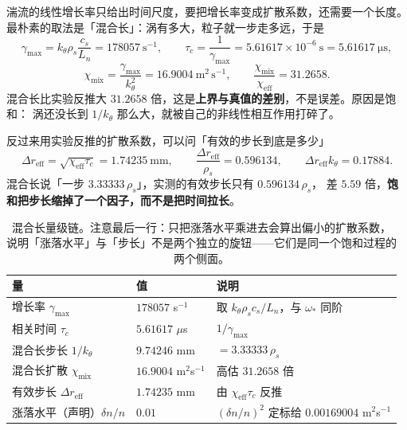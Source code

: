 湍流的线性增长率只给出时间尺度，要把增长率变成扩散系数，还需要一个长度。
最朴素的取法是「混合长」：涡有多大，粒子就一步走多远，于是
\begin{equation}
\gamma_{\max}=k_\theta\rho_s\frac{c_s}{L_n}=178057\ \mathrm{s^{-1}},
\qquad
\tau_c=\frac{1}{\gamma_{\max}}=5.61617\times10^{-6}\ \mathrm{s}=5.61617\ \mathrm{\mu s},
\label{eq:app-af-gamma}
\end{equation}
\begin{equation}
\chi_{\mathrm{mix}}=\frac{\gamma_{\max}}{k_\theta^2}=16.9004\ \mathrm{m^2\,s^{-1}},
\qquad
\frac{\chi_{\mathrm{mix}}}{\chi_{\mathrm{eff}}}=31.2658.
\label{eq:app-af-mixing}
\end{equation}
混合长比实验反推大 $31.2658$ 倍，这是\textbf{上界与真值的差别}，不是误差。原因是饱和：
涡还没长到 $1/k_\theta$ 那么大，就被自己的非线性相互作用打碎了。

反过来用实验反推的扩散系数，可以问「有效的步长到底是多少」
\begin{equation}
\Delta r_{\mathrm{eff}}=\sqrt{\chi_{\mathrm{eff}}\tau_c}=1.74235\ \mathrm{mm},
\qquad
\frac{\Delta r_{\mathrm{eff}}}{\rho_s}=0.596134,
\qquad
\Delta r_{\mathrm{eff}}k_\theta=0.17884.
\label{eq:app-af-dreff}
\end{equation}
混合长说「一步 $3.33333\,\rho_s$」，实测的有效步长只有 $0.596134\,\rho_s$，
差 $5.59$ 倍，\textbf{饱和把步长缩掉了一个因子，而不是把时间拉长}。

\begin{table}[htbp]
\centering
\small
\caption{混合长量级链。注意最后一行：只把涨落水平乘进去会算出偏小的扩散系数，
说明「涨落水平」与「步长」不是两个独立的旋钮——它们是同一个饱和过程的两个侧面。}
\label{tab:app-af-saturation}
\begin{tabular}{p{4.4cm}p{3.2cm}p{4.6cm}}
\toprule
量 & 值 & 说明 \\
\midrule
增长率 $\gamma_{\max}$ & $178057$ s$^{-1}$ & 取 $k_\theta\rho_sc_s/L_n$，与 $\omega_*$ 同阶 \\
相关时间 $\tau_c$ & $5.61617$ $\mu$s & $1/\gamma_{\max}$ \\
混合长步长 $1/k_\theta$ & $9.74246$ mm & $=3.33333\,\rho_s$ \\
混合长扩散 $\chi_{\mathrm{mix}}$ & $16.9004$ m$^2$s$^{-1}$ & 高估 $31.2658$ 倍 \\
有效步长 $\Delta r_{\mathrm{eff}}$ & $1.74235$ mm & 由 $\chi_{\mathrm{eff}}\tau_c$ 反推 \\
涨落水平（声明）$\delta n/n$ & $0.01$ & $(\delta n/n)^2$ 定标给 $0.00169004$ m$^2$s$^{-1}$ \\
\bottomrule
\end{tabular}

\end{table}

